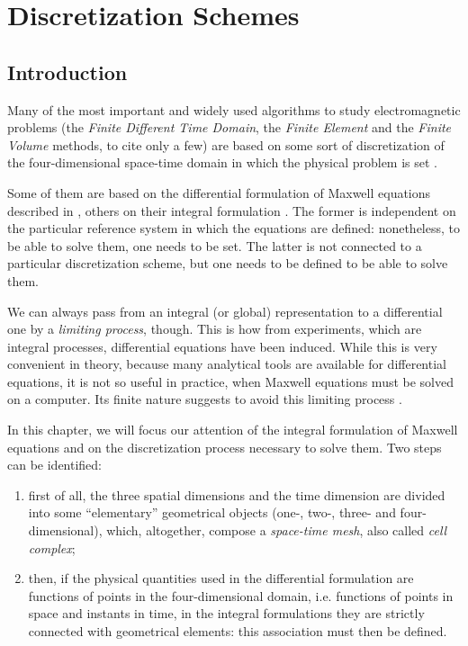 \chapter{Discretization Schemes}  \label{cha:discretization_schemes}

\section{Introduction}

Many of the most important and widely used algorithms to study
electromagnetic problems (the \emph{Finite Different Time Domain}, the
\emph{Finite Element} and the \emph{Finite Volume} methods, to cite
only a few) are based on some sort of discretization of the
four-dimensional space-time domain in which the physical problem is
set \cite{bolla_piers}.

Some of them are based on the differential formulation of Maxwell
equations described in \cite{maxwell_treatise}, others on their
integral formulation \cite{tonti_formulazione}. The former is
independent on the particular reference system in which the equations
are defined: nonetheless, to be able to solve them, one needs to be
set. The latter is not connected to a particular discretization
scheme, but one needs to be defined to be able to solve them.

We can always pass from an integral (or global) representation to a
differential one by a \emph{limiting process}, though. This is how
from experiments, which are integral processes, differential equations
have been induced. While this is very convenient in theory, because
many analytical tools are available for differential equations, it is
not so useful in practice, when Maxwell equations must be solved on a
computer. Its finite nature suggests to avoid this limiting process
\cite{lao_tzu}.

In this chapter, we will focus our attention of the integral
formulation of Maxwell equations and on the discretization process
necessary to solve them. Two steps can be identified:
\begin{enumerate}
\item
  first of all, the three spatial dimensions and the time dimension
  are divided into some ``elementary'' geometrical objects (one-, two-,
  three- and four-dimensional), which,
  altogether, compose a \emph{space-time mesh}, also called \emph{cell
    complex};
\item
  then, if the physical quantities used in the differential
  formulation are functions of points in the four-dimensional domain,
  i.e. functions of points in space and instants in time, in the
  integral formulations they are strictly connected with geometrical
  elements: this association must then be defined.
\end{enumerate}

